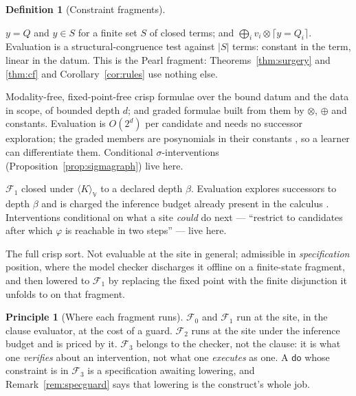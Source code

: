 \documentclass[11pt,a4paper]{article}
\theoremstyle{plain}
\theoremstyle{definition}
\newtheorem{definition}[theorem]{Definition}
\newtheorem{principle}[theorem]{Principle}
\theoremstyle{remark}
\newcommand{\V}{\mathbb{V}}
\newcommand{\tensorv}{\otimes}
\newcommand{\sumv}{\oplus}
\newcommand{\crisp}[1]{\lceil #1 \rceil}
\newcommand{\dok}{\textsf{do}}
\begin{document}
\begin{definition}[Constraint fragments]\label{def:fragments}
\begin{description}[leftmargin=1.6em,itemsep=2pt]
\item[$\mathcal{F}_0$ (values).] $y = Q$ and $y \in S$ for a finite set $S$ of
closed terms; and $\bigoplus_i v_i \tensorv \crisp{y = Q_i}$. Evaluation is a
structural-congruence test against $|S|$ terms: constant in the term, linear in
the datum. This is the Pearl fragment: Theorems~\ref{thm:surgery} and
\ref{thm:cf} and Corollary~\ref{cor:rules} use nothing else.
\item[$\mathcal{F}_1$ (spatial).] Modality-free, fixed-point-free crisp
formulae over the bound datum and the data in scope, of bounded depth $d$; and
graded formulae built from them by $\tensorv$, $\sumv$ and constants. Evaluation
is $O(2^d)$ per candidate and needs no successor exploration; the graded members
are posynomials in their constants \cite[Prop.~5.2]{GradedPLN}, so a learner
can differentiate them. Conditional $\sigma$-interventions
(Proposition~\ref{prop:sigmagraph}) live here.
\item[$\mathcal{F}_2$ (budgeted modal).] $\mathcal{F}_1$ closed under
$\langle K\rangle_\V$ to a declared depth $\beta$. Evaluation explores
successors to depth $\beta$ and is charged the inference budget already present
in the calculus \cite[Rem.~6.5]{GradedV4}. Interventions conditional on what a
site \emph{could} do next --- ``restrict to candidates after which $\varphi$ is
reachable in two steps'' --- live here.
\item[$\mathcal{F}_3$ (fixed points).] The full crisp sort. Not evaluable at
the site in general; admissible in \emph{specification} position, where the
model checker discharges it offline on a finite-state fragment, and then
lowered to $\mathcal{F}_1$ by replacing the fixed point with the finite
disjunction it unfolds to on that fragment.
\end{description}
\end{definition}

\begin{principle}[Where each fragment runs]\label{prin:fragments}
$\mathcal{F}_0$ and $\mathcal{F}_1$ run at the site, in the clause evaluator,
at the cost of a guard. $\mathcal{F}_2$ runs at the site under the inference
budget and is priced by it. $\mathcal{F}_3$ belongs to the checker, not the
clause: it is what one \emph{verifies} about an intervention, not what one
\emph{executes} as one. A $\dok$ whose constraint is in $\mathcal{F}_3$ is a
specification awaiting lowering, and Remark~\ref{rem:specguard} says that
lowering is the construct's whole job.
\end{principle}
\end{document}
